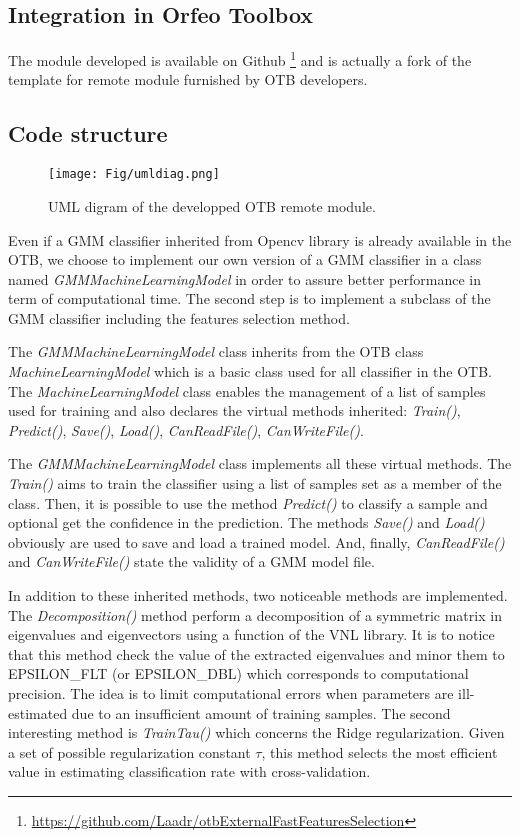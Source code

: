 \documentclass[a4paper,11pt,DIV=16]{scrartcl}
\begin{document}
        \subsection{Integration in Orfeo Toolbox}

        The module developed is available on Github \footnote{\url{https://github.com/Laadr/otbExternalFastFeaturesSelection}} and is actually a fork of the template for remote module furnished by OTB developers.

        \subsection{Code structure}

        \begin{figure}[!ht]
            \centering
            \texttt{[image: Fig/umldiag.png]}
            \caption{UML digram of the developped OTB remote module.\label{fig:uml}}
        \end{figure}

        Even if a GMM classifier inherited from Opencv library is already available in the OTB, we choose to implement our own version of a GMM classifier in a class named \emph{GMMMachineLearningModel} in order to assure better performance in term of computational time. The second step is to implement a subclass of the GMM classifier including the features selection method.

        The \emph{GMMMachineLearningModel} class inherits from the OTB class \emph{MachineLearningModel} which is a basic class used for all classifier in the OTB. The \emph{MachineLearningModel} class enables the management of a list of samples used for training and also declares the virtual methods inherited: \emph{Train()}, \emph{Predict()}, \emph{Save()}, \emph{Load()}, \emph{CanReadFile()}, \emph{CanWriteFile()}.

        The \emph{GMMMachineLearningModel} class implements all these virtual methods. The \emph{Train()} aims to train the classifier using a list of samples set as a member of the class. Then, it is possible to use the method \emph{Predict()} to classify a sample and optional get the confidence in the prediction. The methods \emph{Save()} and \emph{Load()} obviously are used to save and load a trained model. And, finally, \emph{CanReadFile()} and \emph{CanWriteFile()} state the validity of a GMM model file.

        In addition to these inherited methods, two noticeable methods are implemented. The \emph{Decomposition()} method perform a decomposition of a symmetric matrix in eigenvalues and eigenvectors using a function of the VNL library. It is to notice that this method check the value of the extracted eigenvalues and minor them to EPSILON\_FLT (or EPSILON\_DBL) which corresponds to computational precision.  The idea is to limit computational errors when parameters are ill-estimated due to an insufficient amount of training samples. The second interesting method is \emph{TrainTau()} which concerns the Ridge regularization. Given a set of possible regularization constant $\tau$, this method selects the most efficient value in estimating classification rate with cross-validation.
\end{document}
